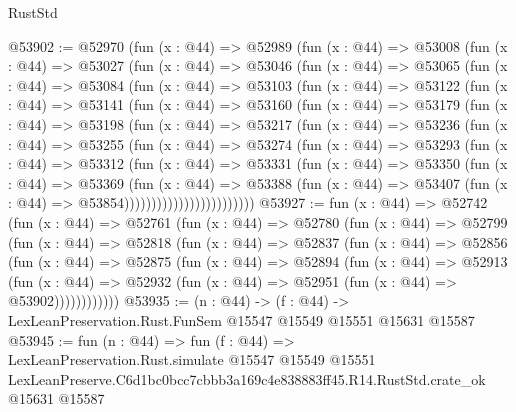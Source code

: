\begin{lexlean}{RustStd}
\begin{coremodule}
@53902 := @52970
    (fun (x : @44) =>
    @52989
      (fun (x : @44) =>
      @53008
        (fun (x : @44) =>
        @53027
          (fun (x : @44) =>
          @53046
            (fun (x : @44) =>
            @53065
              (fun (x : @44) =>
              @53084
                (fun (x : @44) =>
                @53103
                  (fun (x : @44) =>
                  @53122
                    (fun (x : @44) =>
                    @53141
                      (fun (x : @44) =>
                      @53160
                        (fun (x : @44) =>
                        @53179
                          (fun (x : @44) =>
                          @53198
                            (fun (x : @44) =>
                            @53217
                              (fun (x : @44) =>
                              @53236
                                (fun (x : @44) =>
                                @53255
                                  (fun (x : @44) =>
                                  @53274
                                    (fun (x : @44) =>
                                    @53293
                                      (fun (x : @44) =>
                                      @53312
                                        (fun (x : @44) =>
                                        @53331
                                          (fun (x : @44) =>
                                          @53350
                                            (fun (x : @44) =>
                                            @53369
                                              (fun (x : @44) =>
                                              @53388
                                                (fun (x : @44) =>
                                                @53407
                                                  (fun (x : @44) => @53854))))))))))))))))))))))))
@53927 := fun (x : @44) =>
  @52742
    (fun (x : @44) =>
    @52761
      (fun (x : @44) =>
      @52780
        (fun (x : @44) =>
        @52799
          (fun (x : @44) =>
          @52818
            (fun (x : @44) =>
            @52837
              (fun (x : @44) =>
              @52856
                (fun (x : @44) =>
                @52875
                  (fun (x : @44) =>
                  @52894
                    (fun (x : @44) =>
                    @52913
                      (fun (x : @44) =>
                      @52932 (fun (x : @44) => @52951 (fun (x : @44) => @53902))))))))))))
@53935 := (n : @44) ->
  (f : @44) -> LexLeanPreservation.Rust.FunSem @15547 @15549 @15551 @15631 @15587
@53945 := fun (n : @44) =>
  fun (f : @44) =>
  LexLeanPreservation.Rust.simulate
    @15547
    @15549
    @15551
    LexLeanPreserve.C6d1bc0bcc7cbbb3a169c4e838883ff45.R14.RustStd.crate_ok
    @15631
    @15587
\end{coremodule}
\end{lexlean}
